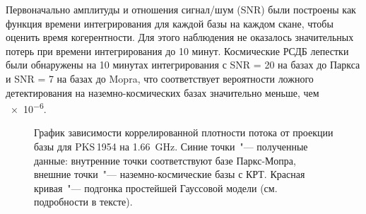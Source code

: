 Первоначально амплитуды и отношения сигнал/шум (SNR) были построены как функция времени
интегрирования для каждой базы на каждом скане, чтобы оценить время когерентности. Для этого
наблюдения не оказалось значительных потерь при времени интегрирования до 10 минут. Космические РСДБ
лепестки были обнаружены на 10 минутах интегрирования с SNR = 20 на базах до Паркса и SNR = 7 на
базах до Mopra, что соответствует вероятности ложного детектирования на наземно-космических базах
значительно меньше, чем \num{e-6}.

\begin{figure}[]
\caption{График зависимости коррелированной плотности потока от проекции базы для
PKS\,1954 на \SI{1.66}{\GHz}. Синие точки~"--- полученные данные: внутренние точки
соответствуют базе Паркс-Мопра, внешние точки~"--- наземно-космические базы с КРТ. Красная
кривая~"--- подгонка простейшей Гауссовой модели (см. подробности в тексте).}
\label{fig:pks_1954_radplot}
\end{figure}

